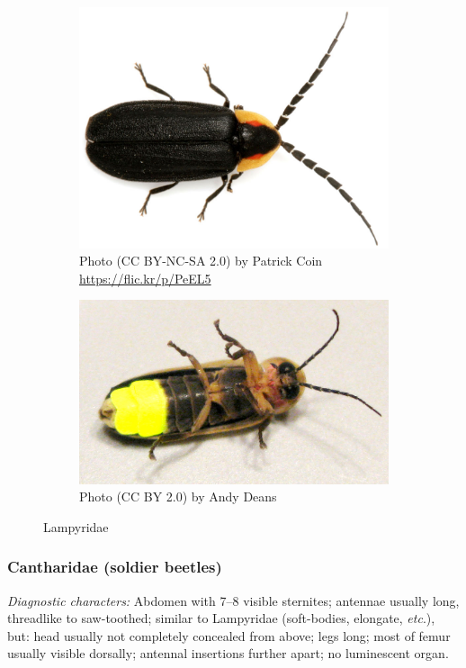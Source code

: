 \documentclass[letterpaper, 11pt]{article}
\begin{document}
\begin{figure}[ht!]
  \centering
\begin{subfigure}[ht!]{0.42\textwidth}
    \includegraphics[width=\textwidth]{LampyridHabitus}
  \caption{Photo (CC BY-NC-SA 2.0) by Patrick Coin \url{https://flic.kr/p/PeEL5}}
  \label{fig:lampyrid1}
\end{subfigure}
    \qquad
\begin{subfigure}[ht!]{0.3\textwidth}
    \includegraphics[width=\textwidth]{LampyridHabitusVentral}
  \caption{Photo (CC BY 2.0) by Andy Deans}
  \label{fig:lampyrid2}\end{subfigure}
    \caption{Lampyridae}\label{fig:lampyrids}
\end{figure}

\subsubsection{Cantharidae (soldier beetles)}
\noindent{}\textit{Diagnostic characters:} Abdomen with 7--8 visible sternites; antennae usually long, threadlike to saw-toothed; similar to Lampyridae (soft-bodies, elongate, \textit{etc}.), but: head usually not completely concealed from above; legs long; most of femur usually visible dorsally; antennal insertions further apart; no luminescent organ.\\
\end{document}
